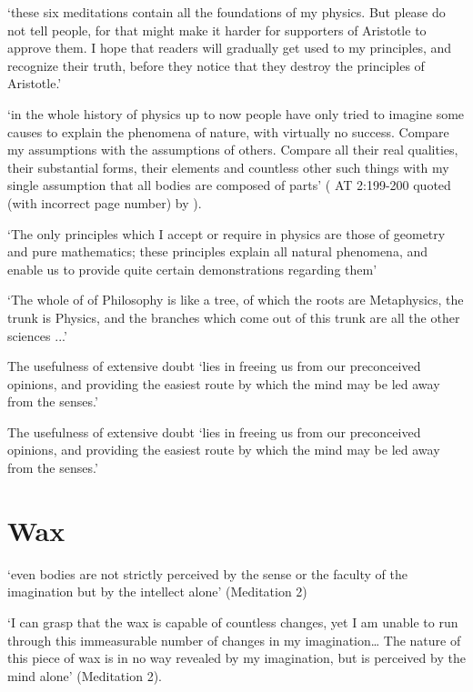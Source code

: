 \documentclass[12pt]{extarticle}
\begin{document}
\begin{multicols*}{3}
‘these six meditations contain all the foundations of my physics.  But please do not tell people, for that might make it harder for supporters of Aristotle to approve them.  I hope that readers will gradually get used to my principles, and recognize their truth,  before they notice that  they destroy the principles of Aristotle.’ 
 
‘in the whole history of physics up to now people have
only tried to imagine some causes to explain the phenomena of nature, with
virtually no success.
Compare my assumptions with the assumptions of others.
Compare all their real qualities, their substantial forms, their elements and
countless other such things
with 
my single assumption that 
all bodies are composed of parts’
(\citealp[p.~107]{descartes:1984_vol3} AT 2:199-200 quoted (with incorrect page number) by \citealp{sorell:2018_experimental}).
 
‘The only principles which I accept or require in physics are those of geometry and pure mathematics;  these principles explain all natural phenomena, and enable us to provide quite certain demonstrations  regarding them’  
\citep[p.~247 AT 2:64]{descartes:1985_csm1}
 
‘The whole of of Philosophy is like a tree, of which the roots are Metaphysics,
the trunk is Physics, and the branches which come out of this trunk are all the
other sciences ...’
\citep[p.~186]{descartes:1985_csm1}
 
The usefulness of extensive doubt ‘lies in freeing us from our preconceived opinions,  and providing the easiest route by which the mind may be  led away from the senses.’
 
The usefulness of extensive doubt ‘lies in freeing us from our preconceived opinions,  and providing the easiest route by which the mind may be  led away from the senses.’
 
 
 
\section{Wax}
 
‘even bodies are not strictly perceived by the sense or the faculty of the imagination but by the
intellect alone’
(Meditation 2)
 
‘I can grasp that the wax is capable of countless changes, yet I am unable to run through this
immeasurable number of changes in my imagination… The nature of this piece of wax is in no way
revealed by my imagination, but is perceived by the mind alone’
(Meditation 2).
 

\end{multicols*}
\end{document}
